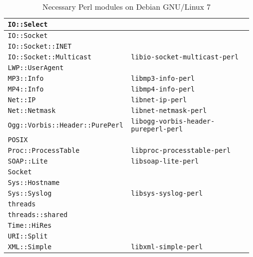 \begin{table}
\begin{tabular}{|p{15em}|p{18em}|}
		\hline
		\verb|IO::Select| 										& \\
		\hline
		\verb|IO::Socket| 										& \\
		\hline
		\verb|IO::Socket::INET| 							& \\
		\hline
		\verb|IO::Socket::Multicast| 					& \verb|libio-socket-multicast-perl| \\
		\hline
		\verb|LWP::UserAgent| 								& \\
		\hline
		\verb|MP3::Info| 											& \verb|libmp3-info-perl| \\
		\hline
		\verb|MP4::Info| 											& \verb|libmp4-info-perl| \\
		\hline
		\verb|Net::IP| 												& \verb|libnet-ip-perl| \\
		\hline
		\verb|Net::Netmask| 									& \verb|libnet-netmask-perl| \\
		\hline
		\verb|Ogg::Vorbis::Header::PurePerl| 	& \verb|libogg-vorbis-header-pureperl-perl| \\
		\hline
		\verb|POSIX| 													& \\
		\hline
		\verb|Proc::ProcessTable| 						& \verb|libproc-processtable-perl| \\
		\hline
		\verb|SOAP::Lite| 										& \verb|libsoap-lite-perl| \\
		\hline
		\verb|Socket| 												& \\
		\hline
		\verb|Sys::Hostname| 									& \\
		\hline
		\verb|Sys::Syslog| 										& \verb|libsys-syslog-perl| \\
		\hline
		\verb|threads| 												& \\
		\hline
		\verb|threads::shared| 								& \\
		\hline
		\verb|Time::HiRes|										& \\
		\hline
		\verb|URI::Split| 										& \\
		\hline
		\verb|XML::Simple| 										& \verb|libxml-simple-perl| \\
		\hline
	\end{tabular}
	\caption{Necessary Perl modules on Debian GNU/Linux 7}
	\label{tab:NecessaryPerlModulesDebian7}
\end{table}

